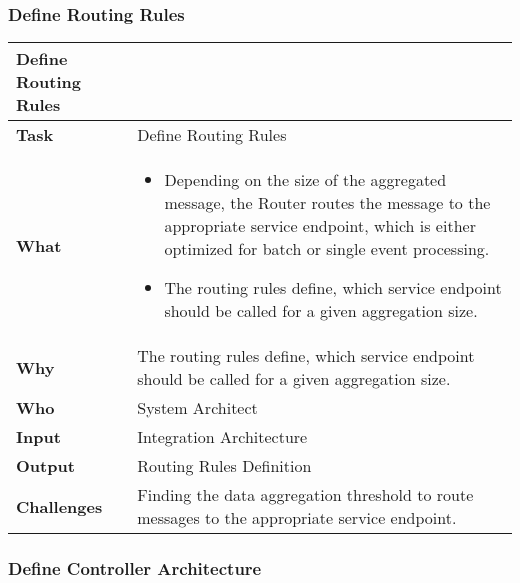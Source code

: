 \subsubsection{Define Routing Rules}
\begin{tabularx}{\textwidth}{@{} l X @{}}
	\caption{table}{Define Routing Rules} \label{table:ch6_Task_Define_Routing_Rules}\\
	\toprule 
	\bfseries Task & Define Routing Rules\\
	\midrule 
	\bfseries What & 
	\begin{itemize}
		\item Depending on the size of the aggregated message, the Router routes the message to the appropriate service endpoint, which is either optimized for batch or single event processing.
		\item The routing rules define, which service endpoint should be called for a given aggregation size.
	\end{itemize}
	\\
	\midrule 
	\bfseries Why & The routing rules define, which service endpoint should be called for a given aggregation size.\\
	\midrule
	\bfseries Who & System Architect\\
	\midrule
	\bfseries Input & Integration Architecture
	\\
	\midrule 
	\bfseries Output & Routing Rules Definition\\
	\midrule 
	\bfseries Challenges & Finding the data aggregation threshold to route messages to the appropriate service endpoint.\\
	\bottomrule 
\end{tabularx}

\subsubsection{Define Controller Architecture}


